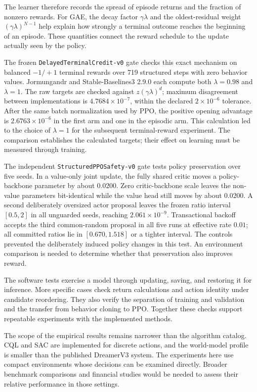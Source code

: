 \documentclass{strategynet-journal}
\begin{document}
\begin{SNcolumns}
The learner therefore records the spread of episode returns and the fraction
of nonzero rewards. For GAE, the decay factor $\gamma\lambda$ and the
oldest-residual weight $(\gamma\lambda)^{N-1}$ help explain how strongly a
terminal outcome reaches the beginning of an episode. These quantities connect
the reward schedule to the update actually seen by the policy.

The frozen \texttt{DelayedTerminalCredit-v0} gate checks this exact mechanism
on balanced $-1/+1$ terminal rewards over 719 structured steps with zero
behavior values.  Jormungandr and Stable-Baselines3 2.9.0 each compute both
$\lambda=0.98$ and $\lambda=1$.  The raw targets are checked against
$z(\gamma\lambda)^d$; maximum disagreement between implementations is
$4.7684\times10^{-7}$, within the declared $2\times10^{-6}$ tolerance.  After
the same batch normalization used by PPO, the positive opening advantage is
$2.6763\times10^{-6}$ in the first arm and one in the episodic arm.  This calculation led to the choice of $\lambda=1$ for the subsequent
terminal-reward experiment. The comparison establishes the calculated targets;
their effect on learning must be measured through training.

The independent \texttt{StructuredPPOSafety-v0} gate tests policy preservation
over five seeds.  In a value-only joint update, the fully shared critic
moves a policy-backbone parameter by about $0.0200$.  Zero critic-backbone
scale leaves the non-value parameters bit-identical while the value head still
moves by about $0.0200$.  A second deliberately oversized actor proposal leaves
the frozen ratio interval $[0.5,2]$ in all unguarded seeds, reaching
$2.061\times10^{-9}$.  Transactional backoff accepts the third common-random
proposal in all five runs at effective rate $0.01$; all committed ratios lie in
$[0.670,1.518]$ or a tighter interval.  The controls prevented the deliberately induced policy changes in this test.
An environment comparison is needed to determine whether that preservation
also improves reward.

The software tests exercise a model through updating, saving, and restoring
it for inference. More specific cases check return calculations and action
identity under candidate reordering. They also verify the separation of
training and validation and the transfer from behavior cloning to PPO.
Together these checks support repeatable experiments with the implemented
methods.

The scope of the empirical results remains narrower than the algorithm
catalog. CQL and SAC are implemented for discrete actions, and the world-model
profile is smaller than the published DreamerV3 system. The experiments here
use compact environments whose decisions can be examined directly. Broader
benchmark comparisons and financial studies would be needed to assess their
relative performance in those settings.


\end{SNcolumns}
\end{document}
